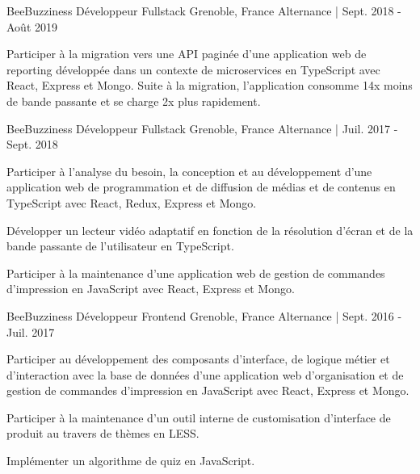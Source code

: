 \begin{cventries}
  \cventry
  	{BeeBuzziness} %
    {Développeur Fullstack} %
    {Grenoble, France} %
    {Alternance | Sept. 2018 - Août 2019} %
    {
      \begin{cvitems} %
        \item {Participer à la migration vers une API paginée d'une application web de reporting développée dans un contexte de microservices en TypeScript avec React, Express et Mongo.
        Suite à la migration, l'application consomme 14x moins de bande passante et se charge 2x plus rapidement.}
      \end{cvitems}
    }

  \cventry
  	{BeeBuzziness} %
    {Développeur Fullstack} %
    {Grenoble, France} %
    {Alternance | Juil. 2017 - Sept. 2018} %
    {
      \begin{cvitems} %
      \item {Participer à l’analyse du besoin, la conception et au développement d’une application web de programmation et de diffusion de médias et de contenus en TypeScript avec React, Redux, Express et Mongo.}
        \item {Développer un lecteur vidéo adaptatif en fonction de la résolution d'écran et de la bande passante de l'utilisateur en TypeScript.}
        \item {Participer à la maintenance d’une application web de gestion de commandes d'impression en JavaScript avec React, Express et Mongo.}
      \end{cvitems}
    }

  \cventry
  	{BeeBuzziness} %
    {Développeur Frontend} %
    {Grenoble, France} %
    {Alternance | Sept. 2016 - Juil. 2017} %
    {
      \begin{cvitems} %
        \item {Participer au développement des composants d’interface, de logique métier et d’interaction avec la base de données d'une application web d'organisation et de gestion de commandes d'impression en JavaScript avec React, Express et Mongo.}
        \item {Participer à la maintenance d’un outil interne de customisation d’interface de produit au travers de thèmes en LESS.}
        \item {Implémenter un algorithme de quiz en JavaScript.}
      \end{cvitems}
    }

\end{cventries}
